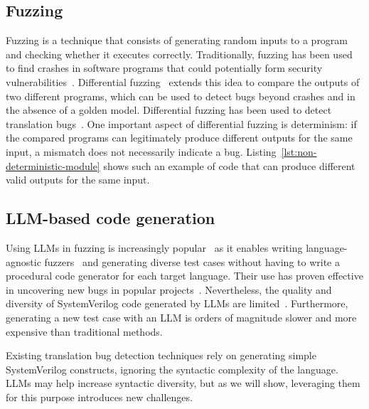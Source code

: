 \subsection{Fuzzing}
\label{sec:background:fuzzing}

Fuzzing is a technique that consists of generating random inputs to a program and checking whether it executes correctly.
Traditionally, fuzzing has been used to find crashes in software programs that could potentially form security vulnerabilities~\cite{afl,GodefroidLM08,
    GodefroidLM12,
    StephensGSVWKV16,
    RawatJKGB17,
    ChenC18,
    fioraldi2020aflpp,
    LemieuxS18,
    WangCCLW19,
    pham2019smart,
    chen2019enfuzz,
    bohme2017directed,
    natella2022stateafl,
    canakci2022targetfuzz,
    wang2024progress}.
Differential fuzzing~\cite{hur2021difuzzrtl,Wachter2025DUMPLING,Yang2011Csmith} extends this idea to compare the outputs of two different programs, which can be used to detect bugs beyond crashes and in the absence of a golden model.
Differential fuzzing has been used to detect translation bugs~\cite{vloghammer,verismith,mirtl}.
One important aspect of differential fuzzing is determinism: if the compared programs can legitimately produce different outputs for the same input, a mismatch does not necessarily indicate a bug.
Listing~\ref{lst:non-deterministic-module} shows such an example of code that can produce different valid outputs for the same input.


\subsection{LLM-based code generation}
\label{sec:background:llm-code-generation}

Using LLMs in fuzzing is increasingly popular~\cite{10731701,assertllm,hdleval,llmproto,verilogreader} as it enables writing language-agnostic fuzzers~\cite{jiang2024llmfuzz,ossfuzzgen}
and generating diverse test cases without having to write a procedural code generator for each target language.
Their use has proven effective in uncovering new bugs in popular projects~\cite{ossfuzzgen}.
Nevertheless, the quality and diversity of SystemVerilog code generated by LLMs are limited~\cite{hdl2v}.
Furthermore, generating a new test case with an LLM is orders of magnitude slower and more expensive than traditional methods.

Existing translation bug detection techniques rely on generating simple SystemVerilog constructs, ignoring the syntactic complexity of the language.
LLMs may help increase syntactic diversity, but as we will show, leveraging them for this purpose introduces new challenges.
